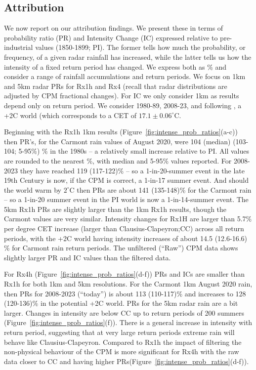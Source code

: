\documentclass[11pt,a4paper]{article}
\begin{document}
\subsection{Attribution}
\label{subsect:attribution}
We now report on our attribution findings. We present these in terms of probability ratio (PR) and  Intensity Change (IC) expressed relative to pre-industrial values (1850-1899; PI). The former tells how much the probability, or frequency, of a given radar rainfall has increased, while the latter tells us how the intensity of a fixed  return period has changed. We express both as \% and consider a range of rainfall accumulations and return periods. We focus on 1km and 5km radar PRs for Rx1h and Rx4 (recall that radar distributions are adjusted by CPM fractional changes).  For IC we only consider 1km as results depend only on return period.  We consider 1980-89, 2008-23, and following \cite{tett2023edinburgh}, a +2C world (which corresponds to a CET of $17.1 \pm 0.06 ^\circ$C.  

Beginning with the Rx1h 1km results (Figure~\ref{fig:intense_prob_ratios}(a-c)) then PR's, for the Carmont rain values of August 2020,  were 104 (median) (103-104; 5-95\%) \% in the 1980s -- a relatively small increase relative to PI. All values are rounded to the nearest \%, with median and 5-95\% values reported. For 2008-2023 they have reached  119 (117-122)\% -- so a 1-in-20-summer event in the late 19th Century is now, if the CPM is correct, a 1-in-17 summer event.  And should the world warm by $2^\circ$C then PRs are about 141 (135-148)\% for the Carmont rain -- so a 1-in-20 summer event in the PI world is now a 1-in-14-summer event. The 5km Rx1h PRs are slightly larger than the 1km Rx1h results, though the Carmont values are very similar. Intensity changes for Rx1H are larger than 5.7\% per degree CET increase (larger than Clausius-Clapeyron;CC) across all return periods, with the +2C world having intensity increases of about 14.5 (12.6-16.6) \% for Carmont rain return periods. The unfiltered (``Raw'') CPM data  shows slightly larger PR and IC values than the filtered data.

For Rx4h  (Figure~\ref{fig:intense_prob_ratios}(d-f)) PRs and ICs are smaller than  Rx1h for both 1km and 5km resolutions. For the Carmont 1km  August 2020 rain, then PRs for 2008-2023 (``today'') is about  113 (110-117)\% and increases to 128 (120-136)\% in the potential +2C world. PRs for the 5km radar rain are a bit larger.  Changes in intensity are below CC up to return periods of 200 summers  (Figure~\ref{fig:intense_prob_ratios}(f)).  There is a general increase in intensity with return period, suggesting that at very large return periods extreme rain will behave like   Clausius-Clapeyron. Compared to Rx1h the impact of filtering the non-physical behaviour of the CPM is more significant for Rx4h  with the raw data closer to  CC and having higher PRs(Figure~\ref{fig:intense_prob_ratios}(d-f)). 
\end{document}
